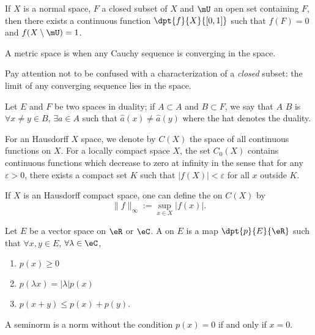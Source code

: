 \begin{lemma}
If $X$ is a normal space, $F$ a closed subset of $X$ and $\mU$ an open set containing $F$, then there exists a continuous function $\dpt{f}{X}{[0,1]}$ such that $f(F)=0$ and $f(X\setminus\mU)=1$. \label{lem:Urysohn}
\end{lemma}

\begin{definition}
A metric space is  when any Cauchy sequence is converging in the space.
\end{definition}

Pay attention not to be confused with a characterization of a \emph{closed} subset: the limit of any converging sequence lies in the space.

\begin{definition}
Let $E$ and $F$ be two spaces in duality; if $A\subset A$ and $B\subset F$, we say that $A$  $B$ is $\forall x\neq y\in B$, $\exists a\in A$ such that $\hat{a}(x)\neq\hat{a}(y)$ where the hat denotes the duality. \label{def:separe}
\end{definition}

For an Hausdorff $X$ space, we denote by $C(X)$\label{pg_def_Cz } the space of all continuous functions on $X$. For a locally compact space $X$, the set $C_0(X)$ contains continuous functions which decrease to zero at infinity in the sense that for any $\varepsilon>0$, there exists a compact set $K$ such that $|f(X)|<\varepsilon$ for all $x$ outside $K$.

\begin{definition}
If $X$ is an Hausdorff compact space, one can define the  on $C(X)$ by
\begin{equation}
   \|f\|_{\infty}:=\sup_{x\in X}|f(x)|.
\end{equation}
\label{def:sup_norm}
\end{definition}

\begin{definition}
Let $E$ be a vector space on $\eR$ or $\eC$. A  on $E$ is a map $\dpt{p}{E}{\eR}$ such that $\forall x,y\in E$, $\forall\lambda\in\eC$,
\begin{enumerate}
\item $p(x)\geq 0$
\item $p(\lambda x)=|\lambda|p(x)$
\item $p(x+y)\leq p(x)+p(y)$.
\end{enumerate}
\end{definition}
A seminorm is a norm without the condition  $p(x)=0$ if and only if $x=0$.

